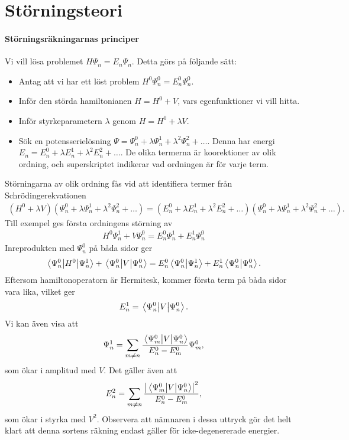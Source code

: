 \section{Störningsteori}

\paragraph{Störningsräkningarnas principer}
Vi vill lösa problemet $H\Psi_{n} = E_{n}\Psi_{n}$. Detta görs på följande sätt:
\begin{itemize}
	\item Antag att vi har ett löst problem $H^{0}\Psi_{n}^{0} = E_{n}^{0}\Psi_{n}^{0}$.
	\item Inför den störda hamiltonianen $H = H^{0} + V$, vars egenfunktioner vi vill hitta.
	\item Inför styrkeparametern $\lambda$ genom $H = H^{0} + \lambda V$.
	\item Sök en potensserielösning $\Psi = \Psi_{n}^{0} + \lambda\Psi_{n}^{1} + \lambda^{2}\Psi_{n}^{2}+ \dots$. Denna har energi $E_{n} = E_{n}^{0} + \lambda E_{n}^{1} + \lambda^{2}E_{n}^{2} + \dots$. De olika termerna är koorektioner av olik ordning, och superskriptet indikerar vad ordningen är för varje term.
\end{itemize}

Störningarna av olik ordning fås vid att identifiera termer från Schrödingerekvationen
\begin{align*}
	(H^{0} + \lambda V)(\Psi_{n}^{0} + \lambda\Psi_{n}^{1} + \lambda^{2}\Psi_{n}^{2}+ \dots) = (E_{n}^{0} + \lambda E_{n}^{1} + \lambda^{2}E_{n}^{2} + \dots)(\Psi_{n}^{0} + \lambda\Psi_{n}^{1} + \lambda^{2}\Psi_{n}^{2}+ \dots).
\end{align*}
Till exempel ges första ordningens störning av
\begin{align*}
	H^{0}\Psi_{n}^{1} + V\Psi_{n}^{0} = E_{n}^{0}\Psi_{n}^{1} + E_{n}^{1}\Psi_{n}^{0}
\end{align*}
Inreprodukten med $\Psi_{n}^{0}$ på båda sidor ger
\begin{align*}
	\mel{\Psi_{n}^{0}}{H^{0}}{\Psi_{n}^{1}} + \mel{\Psi_{n}^{0}}{V}{\Psi_{n}^{0}} = E_{n}^{0}\braket{\Psi_{n}^{0}}{\Psi_{n}^{1}} + E_{n}^{1}\braket{\Psi_{n}^{0}}{\Psi_{n}^{0}}.
\end{align*}
Eftersom hamiltonoperatorn är Hermitesk, kommer första term på båda sidor vara lika, vilket ger
\begin{align*}
	 E_{n}^{1} = \mel{\Psi_{n}^{0}}{V}{\Psi_{n}^{0}}.
\end{align*}
Vi kan även visa att
\begin{align*}
	\Psi_{n}^{1} = \sum\limits_{m \neq n}\frac{\mel{\Psi_{m}^{0}}{V}{\Psi_{n}^{0}}}{E_{n}^{0} - E_{m}^{0}}\Psi_{m}^{0},
\end{align*}
som ökar i amplitud med $V$. Det gäller även att
\begin{align*}
	E_{n}^{2} = \sum\limits_{m \neq n}\frac{\abs{\mel{\Psi_{m}^{0}}{V}{\Psi_{n}^{0}}}^{2}}{E_{n}^{0} - E_{m}^{0}},
\end{align*}
som ökar i styrka med $V^{2}$. Observera att nämnaren i dessa uttryck gör det helt klart att denna sortens räkning endast gäller för icke-degenererade energier.

